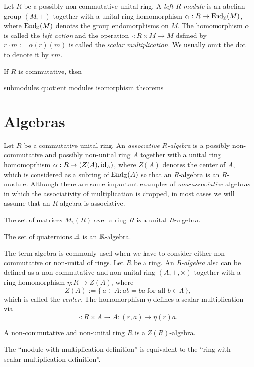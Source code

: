 \documentclass{../../large}
\begin{document}
\begin{prb}
Let $R$ be a possibly non-commutative unital ring.
A \emph{left $R$-module} is an abelian group $(M,+)$ together with a unital ring homomorphism $\alpha:R\to\operatorname{End}_{\mathbb{Z}}(M)$, where $\operatorname{End}_{\mathbb{Z}}(M)$ denotes the group endomorphisms on $M$.
The homomorphism $\alpha$ is called the \emph{left action} and the operation $\cdot:R\times M\to M$ defined by $r\cdot m:=\alpha(r)(m)$ is called the \emph{scalar multiplication}.
We usually omit the dot to denote it by $rm$.
\begin{parts}
\item If $R$ is commutative, then
\end{parts}
\end{prb}

submodules
quotient modules
isomorphism theorems


\section{Algebras}
\begin{prb}
Let $R$ be a commutative unital ring.
An \emph{associative $R$-algebra} is a possibly non-commutative and possibly non-unital ring $A$ together with a unital ring homomoprhism $\alpha:R\to(Z(A),\operatorname{id}_A)$, where $Z(A)$ denotes the center of $A$, which is considered as a subring of $\operatorname{End}_{\mathbb{Z}}(A)$ so that an $R$-algebra is an $R$-module.
Although there are some important examples of \emph{non-associative} algebras in which the associativity of multiplication is dropped, in most cases we will assume that an $R$-algebra is associative.
\begin{parts}
\item The set of matrices $M_n(R)$ over a ring $R$ is a unital $R$-algebra.
\item The set of quaternions $\mathbb{H}$ is an $\mathbb{R}$-algebra.
\end{parts}
\end{prb}


\begin{prb}
The term algebra is commonly used when we have to consider either non-commutative or non-unital of rings.
Let $R$ be a ring.
An \emph{$R$-algebra} also can be defined as a non-commutative and non-unital ring $(A,+,\times)$ together with a ring homomorphism $\eta:R\to Z(A)$, where
\[Z(A):=\{\,a\in A:ab=ba\text{ for all }b\in A\,\},\]
which is called the \emph{center}.
The homomorphism $\eta$ defines a scalar multiplication via
\[\cdot:R\times A\to A:(r,a)\mapsto\eta(r)a.\]
\begin{parts}
\item A non-commutative and non-unital ring $R$ is a $Z(R)$-algebra.
\item The ``module-with-multiplication definition'' is equivalent to the ``ring-with-scalar-multiplication definition''.
\end{parts}
\end{prb}
\end{document}
